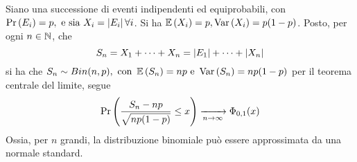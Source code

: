 \documentclass{subfiles}
\begin{document}
\begin{Remark*}
    Siano  una successione di eventi indipendenti ed equiprobabili, con \(\Prob{E_{i}} = p, \text{e sia} X_{i} = \Abs{E_{i}} \forall i\).
    Si ha \(\Expected{X_{i}} = p, \Var{X_{i}} = p(1 - p)\).
    Posto, per ogni \(n \in \operatorname{\mathbb{N}}\), che
    \[
        S_{n} = X_{1} + \cdots + X_{n} = \left\vert {E_{1}} \right\vert + \cdots +\left\vert {X_{n}} \right\vert
    \]
    si ha che \(S_{n} \sim Bin(n, p), \text{con} \Expected{S_{n}} = np \text{e} \Var{S_{n}} = np(1 - p)\)
    per il teorema centrale del limite, segue
    \[
        \Prob{\Frac{S_{n} - np}{\sqrt{np(1-p)}} \le x} \xrightarrow[n \to \infty]{} \Phi_{0, 1}(x)
    \]
    Ossia, per \(n\) grandi, la distribuzione binomiale può essere approssimata da una normale standard.
\end{Remark*}
\end{document}
